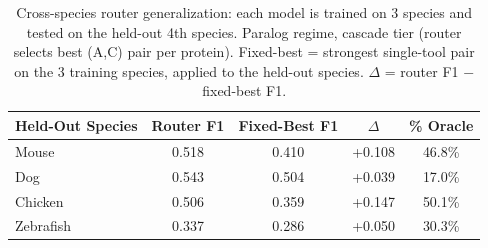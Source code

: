 \begin{table}[t]
\centering
\caption{Cross-species router generalization: each model is trained on 3 species and tested on the held-out 4th species. Paralog regime, cascade tier (router selects best (A,C) pair per protein). Fixed-best = strongest single-tool pair on the 3 training species, applied to the held-out species. $\Delta$ = router F1 $-$ fixed-best F1.}
\label{tab:s2_cross_species}
\small
\setlength{\tabcolsep}{3pt}
\begin{tabular}{lcccc}
\toprule
Held-Out Species & Router F1 & Fixed-Best F1 & $\Delta$ & \% Oracle \\
\midrule
Mouse & 0.518 & 0.410 & +0.108 & 46.8\% \\
Dog & 0.543 & 0.504 & +0.039 & 17.0\% \\
Chicken & 0.506 & 0.359 & +0.147 & 50.1\% \\
Zebrafish & 0.337 & 0.286 & +0.050 & 30.3\% \\
\bottomrule
\end{tabular}
\end{table}